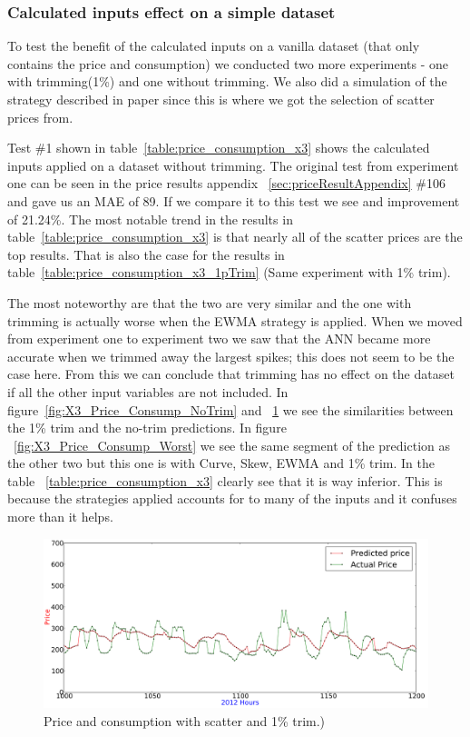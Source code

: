 \subsubsection{Calculated inputs effect on a simple dataset}
To test the benefit of the calculated inputs on a vanilla dataset (that only contains the price and consumption) we conducted two more experiments - one with trimming(1\%) and one without trimming. We also did a simulation of the strategy described in paper \cite{singhal2011electricity} since this is where we got the selection of scatter prices from.

Test \#1 shown in table~\ref{table:price_consumption_x3} shows the calculated inputs applied on a dataset without trimming. The original test from experiment one can be seen in the price results appendix ~\ref{sec:priceResultAppendix} \#106 and gave us an MAE of 89. If we compare it to this test we see and improvement of 21.24\%. The most notable trend in the results in table~\ref{table:price_consumption_x3} is that nearly all of the scatter prices are the top results. That is also the case for the results in table~\ref{table:price_consumption_x3_1pTrim} (Same experiment with 1\% trim).

The most noteworthy are that the two are very similar and the one with trimming is actually worse when the EWMA strategy is applied. When we moved from experiment one to experiment two we saw that the ANN became more accurate when we trimmed away the largest spikes; this does not seem to be the case here. From this we can conclude that trimming has no effect on the dataset if all the other input variables are not included. In figure~\ref{fig:X3_Price_Consump_NoTrim} and ~\ref{fig:X3_Price_Consump_1pTrim} we see the similarities between the 1\% trim and the no-trim predictions. In figure ~\ref{fig:X3_Price_Consump_Worst} we see the same segment of the prediction as the other two but this one is with Curve, Skew, EWMA and 1\% trim. In the table ~\ref{table:price_consumption_x3} clearly see that it is way inferior. This is because the strategies applied accounts for to many of the inputs and it confuses more than it helps.

\begin{figure}[H]
\centering
\includegraphics[width=\linewidth]{billeder/PriceExperimentalAnalysis/X3_Price_Consump_1pTrim.png}
\caption{Price and consumption with scatter and 1\% trim.)}
\label{fig:X3_Price_Consump_1pTrim}
\end{figure}

